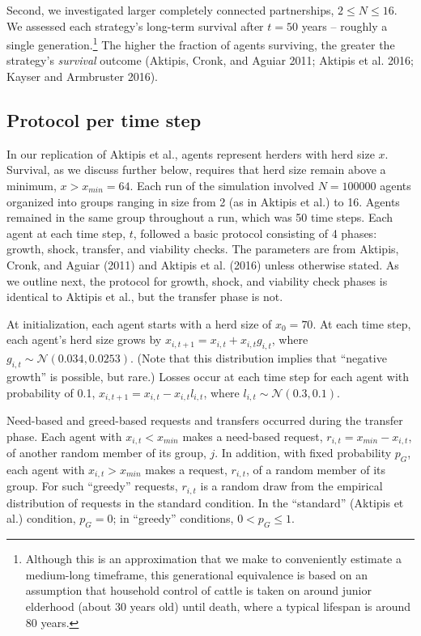 \documentclass[
]{article}
\begin{document}
Second, we investigated larger completely connected partnerships, \(2 \le N \le 16\). We assessed each strategy's long-term survival after \(t=50\) years -- roughly a single generation.\footnote{Although this is an approximation that we make to conveniently estimate a medium-long timeframe, this generational equivalence is based on an assumption that household control of cattle is taken on around junior elderhood (about 30 years old) until death, where a typical lifespan is around 80 years.} The higher the fraction of agents surviving, the greater the strategy's \emph{survival} outcome (Aktipis, Cronk, and Aguiar 2011; Aktipis et al. 2016; Kayser and Armbruster 2016).

\subsection{Protocol per time step}

In our replication of Aktipis et al., agents represent herders with herd size \(x\). Survival, as we discuss further below, requires that herd size remain above a minimum, \(x > x_{min} = 64\). Each run of the simulation involved \(N=100000\) agents organized into groups ranging in size from 2 (as in Aktipis et al.) to 16. Agents remained in the same group throughout a run, which was 50 time steps. Each agent at each time step, \(t\), followed a basic protocol consisting of 4 phases: growth, shock, transfer, and viability checks. The parameters are from Aktipis, Cronk, and Aguiar (2011) and Aktipis et al. (2016) unless otherwise stated. As we outline next, the protocol for growth, shock, and viability check phases is identical to Aktipis et al., but the transfer phase is not.

At initialization, each agent starts with a herd size of \(x_{0}=70\). At each time step, each agent's herd size grows by \(x_{i,t+1} = x_{i,t} + x_{i,t}g_{i,t}\), where \(g_{i,t} \sim \mathcal{N}(0.034, 0.0253)\). (Note that this distribution implies that ``negative growth'' is possible, but rare.) Losses occur at each time step for each agent with probability of 0.1, \(x_{i,t+1} =x_{i,t} - x_{i,t}l_{i,t}\), where \(l_{i,t} \sim \mathcal{N}(0.3, 0.1)\).

Need-based and greed-based requests and transfers occurred during the transfer phase. Each agent with \(x_{i,t} < x_{min}\) makes a need-based request, \(r_{i,t}=x_{min} - x_{i,t}\), of another random member of its group, \(j\). In addition, with fixed probability \(p_G\), each agent with \(x_{i,t} > x_{min}\) makes a request, \(r_{i,t}\), of a random member of its group. For such ``greedy'' requests, \(r_{i,t}\) is a random draw from the empirical distribution of requests in the standard condition. In the ``standard'' (Aktipis et al.) condition, \(p_G=0\); in ``greedy'' conditions, \(0<p_G \le 1\).
\end{document}
